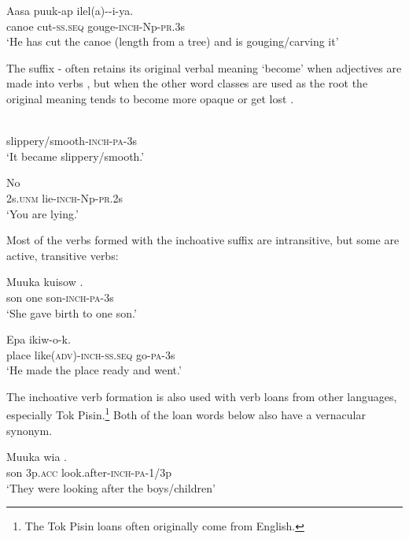 \ea%
\label{ex:3:x200}
\gll Aasa puuk-ap ilel(a)--i-ya. \\
canoe cut-\textsc{ss}.\textsc{seq} gouge-\textsc{inch}-Np-\textsc{pr}.3s \\
\glt`He has cut the canoe (length from a tree) and is gouging/carving it' 
\z

The suffix - often retains its original verbal meaning `become' when adjectives are made into verbs , but when the other word classes are used as the root the original meaning tends to become more opaque or get lost . 

\ea%
\label{ex:3:x201}
\gll {} \\
slippery/smooth-\textsc{inch}-\textsc{pa}-3s \\
\glt`It became slippery/smooth.' 
\z

\ea%
\label{ex:3:x202}
\gll No  \\
2s.\textsc{unm} lie-\textsc{inch}-Np-\textsc{pr}.2s \\
\glt`You are lying.' 
\z

Most of the verbs formed with the inchoative suffix are intransitive, but some are active, transitive verbs:

\ea%
\label{ex:3:x203}
\gll Muuka kuisow . \\
son one son-\textsc{inch}-\textsc{pa}-3s \\
\glt`She gave birth to one son.'
\z

\ea%
\label{ex:3:x204}
\gll Epa  ikiw-o-k. \\
place like(\textsc{adv})-\textsc{inch}-\textsc{ss}.\textsc{seq} go-\textsc{pa}-3s \\
\glt`He made the place ready and went.'
\z

The inchoative verb formation is also used with verb loans from other languages, especially Tok Pisin.\footnote{The Tok Pisin loans often originally come from English.} Both of the loan words below also have a vernacular synonym.

\ea%
\label{ex:3:x487}
\gll Muuka wia .   \\
son 3p.\textsc{acc} look.after-\textsc{inch}-\textsc{pa}-1/3p\\
\glt`They were looking after the boys/children'
\z

